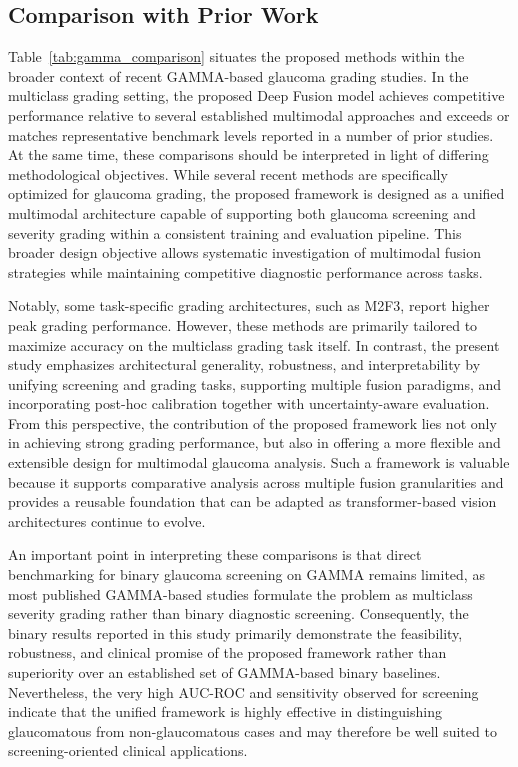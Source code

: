 \documentclass[preprint,12pt]{elsarticle}
\begin{document}
\subsection{Comparison with Prior Work}

Table~\ref{tab:gamma_comparison} situates the proposed methods within the broader context of recent GAMMA-based glaucoma grading studies. In the multiclass grading setting, the proposed Deep Fusion model achieves competitive performance relative to several established multimodal approaches and exceeds or matches representative benchmark levels reported in a number of prior studies. At the same time, these comparisons should be interpreted in light of differing methodological objectives. While several recent methods are specifically optimized for glaucoma grading, the proposed framework is designed as a unified multimodal architecture capable of supporting both glaucoma screening and severity grading within a consistent training and evaluation pipeline. This broader design objective allows systematic investigation of multimodal fusion strategies while maintaining competitive diagnostic performance across tasks.

Notably, some task-specific grading architectures, such as M2F3, report higher peak grading performance. However, these methods are primarily tailored to maximize accuracy on the multiclass grading task itself. In contrast, the present study emphasizes architectural generality, robustness, and interpretability by unifying screening and grading tasks, supporting multiple fusion paradigms, and incorporating post-hoc calibration together with uncertainty-aware evaluation. From this perspective, the contribution of the proposed framework lies not only in achieving strong grading performance, but also in offering a more flexible and extensible design for multimodal glaucoma analysis. Such a framework is valuable because it supports comparative analysis across multiple fusion granularities and provides a reusable foundation that can be adapted as transformer-based vision architectures continue to evolve.

An important point in interpreting these comparisons is that direct benchmarking for binary glaucoma screening on GAMMA remains limited, as most published GAMMA-based studies formulate the problem as multiclass severity grading rather than binary diagnostic screening. Consequently, the binary results reported in this study primarily demonstrate the feasibility, robustness, and clinical promise of the proposed framework rather than superiority over an established set of GAMMA-based binary baselines. Nevertheless, the very high AUC-ROC and sensitivity observed for screening indicate that the unified framework is highly effective in distinguishing glaucomatous from non-glaucomatous cases and may therefore be well suited to screening-oriented clinical applications.
\end{document}
